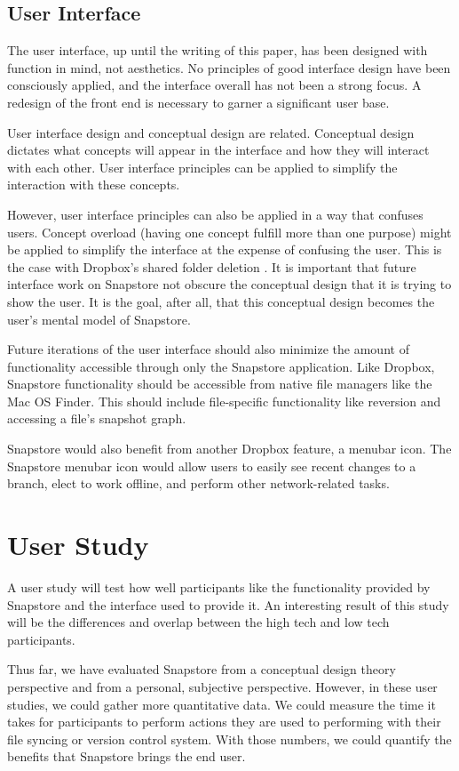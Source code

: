\subsection{User Interface}

The user interface, up until the writing of this paper, has been designed with function in mind, not aesthetics. No principles of good interface design have been consciously applied, and the interface overall has not been a strong focus. A redesign of the front end is necessary to garner a significant user base.

User interface design and conceptual design are related. Conceptual design dictates what concepts will appear in the interface and how they will interact with each other. User interface principles can be applied to simplify the interaction with these concepts. 

However, user interface principles can also be applied in a way that confuses users. Concept overload (having one concept fulfill more than one purpose) might be applied to simplify the interface at the expense of confusing the user. This is the case with Dropbox's shared folder deletion \cite{Zhang}. It is important that future interface work on Snapstore not obscure the conceptual design that it is trying to show the user. It is the goal, after all, that this conceptual design becomes the user's mental model of Snapstore.

Future iterations of the user interface should also minimize the amount of functionality accessible through only the Snapstore application. Like Dropbox, Snapstore functionality should be accessible from native file managers like the Mac OS Finder. This should include file-specific functionality like reversion and accessing a file's snapshot graph.

Snapstore would also benefit from another Dropbox feature, a menubar icon. The Snapstore menubar icon would allow users to easily see recent changes to a branch, elect to work offline, and perform other network-related tasks.

\section{User Study}

A user study will test how well participants like the functionality provided by Snapstore and the interface used to provide it. An interesting result of this study will be the differences and overlap between the high tech and low tech participants.

Thus far, we have evaluated Snapstore from a conceptual design theory perspective and from a personal, subjective perspective. However, in these user studies, we could gather more quantitative data. We could measure the time it takes for participants to perform actions they are used to performing with their file syncing or version control system. With those numbers, we could quantify the benefits that Snapstore brings the end user.





